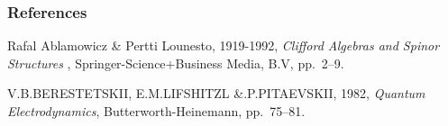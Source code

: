 %
%

\begin{frame} \frametitle{References}
\begin{thebibliography}{xx}\footnotesize

 {\sc Rafal Ablamowicz  \& Pertti Lounesto}, 1919-1992, {\em Clifford Algebras and
Spinor Structures }, Springer-Science+Business Media, B.V, pp.\ 2--9.

 {\sc V.B.BERESTETSKII, E.M.LIFSHITZL \&.P.PITAEVSKII}, 1982, {\em Quantum Electrodynamics}, Butterworth-Heinemann, pp.~75--81.


\end{thebibliography}
\end{frame}
